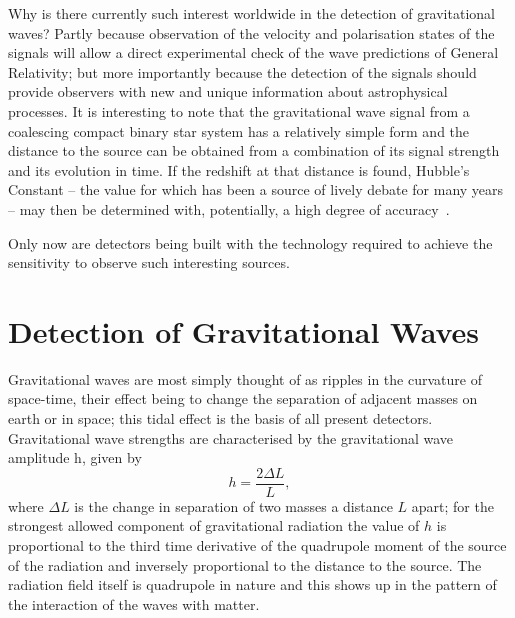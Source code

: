 \documentclass{article}
\begin{document}
Why is there currently such interest worldwide in the detection of gravitational
waves? Partly because observation of the velocity and polarisation states of the
signals will allow a direct experimental check of the wave predictions of
General Relativity; but more importantly because the detection of the signals
should provide observers with new and unique information about astrophysical
processes. It is interesting to note that the gravitational wave signal from a
coalescing compact binary star system has a relatively simple form and the
distance to the source can be obtained from a combination of its signal strength
and its evolution in time. If the redshift at that distance is found, Hubble's
Constant -- the value for which has been a source of lively debate for many
years -- may then be determined with, potentially, a high degree of
accuracy~\cite{Schutz,Holtz:2005}.

Only now are detectors being built with the technology required to achieve the  
sensitivity to observe such interesting sources.


\newpage

\section{Detection of Gravitational Waves}
\label{section:Detection}

Gravitational waves are most simply thought of as ripples in the curvature of
space-time, their effect being to change the separation of adjacent masses on
earth or in space; this tidal effect is the basis of all present detectors.
Gravitational wave strengths are characterised by the gravitational wave
amplitude h, given by
%
\begin{equation}
  h = \frac{2 \Delta L} L,
  \label{equation:h}
\end{equation}
%
where $\Delta L$ is the change in separation of two masses a distance $L$ apart;
for the strongest allowed component of gravitational radiation the value of $h$
is proportional to the third time derivative of the quadrupole moment of the
source of the radiation and inversely proportional to the distance to the
source. The radiation field itself is quadrupole in nature and this shows up in
the pattern of the interaction of the waves with matter.
\end{document}
